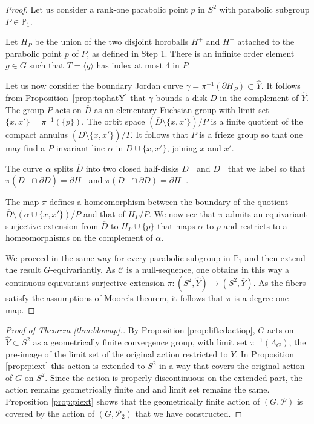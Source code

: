 \documentclass[11pt]{article}
\theoremstyle{definition}
\newcommand\CCC{\mathcal{C}}
\renewcommand\hat{\widehat}
\begin{document}
\begin{proof} Let us consider a rank-one parabolic point $p$ in $S^2$ with parabolic subgroup $P\in\mathbb{P}_1$.

Let $H_P$ be the union of the two disjoint horoballs $H^+$ and $H^-$ attached to the parabolic point $p$ of $P$, as defined in Step 1.
There is an infinite order element $g\in G$ such that $T=\langle g\rangle$ has index at most $4$ in $P$. 

\medskip

Let us now consider the boundary Jordan curve $\gamma=\pi^{-1}(\partial H_P)\subset \hat{Y}$. It follows from Proposition~\ref{prop:tophatY} that $\gamma$ bounds a disk $D$ in the complement of $\hat{Y}$. The group $P$ acts on $\overline{D}$ as an elementary Fuchsian group with limit set $\{x,x'\}=\pi^{-1}(\{p\})$. The orbit space $(\overline{D}\setminus\{x,x'\})/P$ is a finite quotient of the compact annulus $(\overline{D}\setminus\{x,x'\})/T$. It follows that $P$ is a frieze group so that one may find a $P$-invariant line $\alpha$ in $D\cup\{x,x'\}$, joining $x$ and $x'$.

The curve $\alpha$ splits $\overline{D}$ into two closed half-disks $D^+$ and $D^{-}$ that we label so that $\pi(D^+\cap \partial D)= \partial H^+$ and $\pi(D^-\cap \partial D)= \partial H^-$. 


The map $\pi$ defines a homeomorphism between the boundary of the quotient $\overline{D}\setminus(\alpha \cup \{x,x'\})/P$ and that of $H_P/P$. We now see that $\pi$ admits an equivariant surjective extension from $\overline{D}$ to $H_P\cup\{p\}$ that maps $\alpha$ to $p$ and
restricts to a homeomorphisms on the complement of $\alpha$. 

\medskip

We proceed in the same way for every parabolic subgroup in $\mathbb{P}_1$ and then extend the result $G$-equivariantly. As $\CCC$ is a null-sequence, one obtains in this way a continuous equivariant surjective extension $\pi:(S^2,\hat{Y})\to (S^2,\overline{Y})$. As the fibers satisfy the assumptions of Moore's theorem, it follows that $\pi$ is a degree-one map.
\end{proof}

\begin{proof}[Proof of Theorem \ref{thm:blowup}.] By Proposition \ref{prop:liftedactiop}, $G$ acts on $\hat{Y} \subset S^2$ as a geometrically finite convergence group, with limit set $\pi^{-1}(\Lambda_G)$, the pre-image of the limit set of the original action restricted to $Y$. In Proposition \ref{prop:piext} this action is extended to $S^2$ in a way that covers the original action of $G$ on $S^2$.  Since the action is properly discontinuous on the extended part, the action remains geometrically finite and and limit set remains the same. Proposition \ref{prop:piext} shows that the geometrically finite action of $(G, \mathcal{P})$ is covered by the action of $(G, \mathcal{P}_2)$ that we have constructed.   
\end{proof}
 
\end{document}
